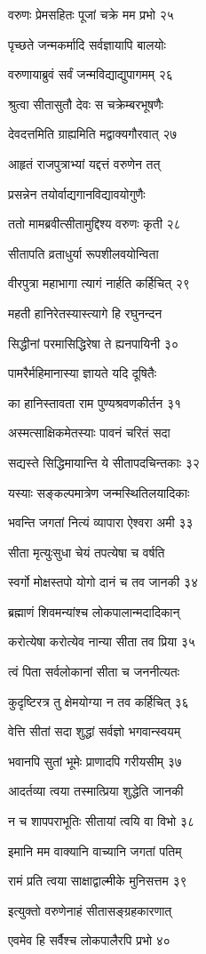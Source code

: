 वरुणः प्रेमसहितः पूजां चक्रे मम प्रभो २५

पृच्छते जन्मकर्मादि सर्वज्ञायापि बालयोः

वरुणायाब्रुवं सर्वं जन्मविद्याद्युपागमम् २६

श्रुत्वा सीतासुतौ देवः स चक्रेम्बरभूषणैः

देवदत्तमिति ग्राह्यमिति मद्वाक्यगौरवात् २७

आहृतं राजपुत्राभ्यां यद्दत्तं वरुणेन तत्

प्रसन्नेन तयोर्वाद्यगानविद्यावयोगुणैः

ततो मामब्रवीत्सीतामुद्दिश्य वरुणः कृती २८

सीतापति व्रताधुर्या रूपशीलवयोन्विता

वीरपुत्रा महाभागा त्यागं नार्हति कर्हिचित् २९

महती हानिरेतस्यास्त्यागे हि रघुनन्दन

सिद्धीनां परमासिद्धिरेषा ते ह्यनपायिनी ३०

पामरैर्महिमानास्या ज्ञायते यदि दूषितैः

का हानिस्तावता राम पुण्यश्रवणकीर्तन ३१

अस्मत्साक्षिकमेतस्याः पावनं चरितं सदा

सद्यस्ते सिद्धिमायान्ति ये सीतापदचिन्तकाः ३२

यस्याः सङ्कल्पमात्रेण जन्मस्थितिलयादिकाः

भवन्ति जगतां नित्यं व्यापारा ऐश्वरा अमी ३३

सीता मृत्युःसुधा चेयं तपत्येषा च वर्षति

स्वर्गो मोक्षस्तपो योगो दानं च तव जानकी ३४

ब्रह्माणं शिवमन्यांश्च लोकपालान्मदादिकान्

करोत्येषा करोत्येव नान्या सीता तव प्रिया ३५

त्वं पिता सर्वलोकानां सीता च जननीत्यतः

कुदृष्टिरत्र तु क्षेमयोग्या न तव कर्हिचित् ३६

वेत्ति सीतां सदा शुद्धां सर्वज्ञो भगवान्स्वयम्

भवानपि सुतां भूमेः प्राणादपि गरीयसीम् ३७

आदर्तव्या त्वया तस्मात्प्रिया शुद्धेति जानकी

न च शापपराभूतिः सीतायां त्वयि वा विभो ३८

इमानि मम वाक्यानि वाच्यानि जगतां पतिम्

रामं प्रति त्वया साक्षाद्वाल्मीके मुनिसत्तम ३९

इत्युक्तो वरुणेनाहं सीतासङ्ग्रहकारणात्

एवमेव हि सर्वैश्च लोकपालैरपि प्रभो ४०

